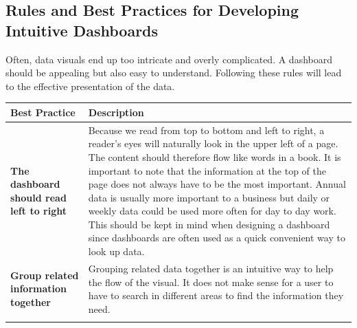 \documentclass[]{book}
\theoremstyle{definition}
\theoremstyle{definition}
\theoremstyle{definition}
\theoremstyle{remark}
\begin{document}
\subsection{Rules and Best Practices for Developing Intuitive
Dashboards}\label{rules-and-best-practices-for-developing-intuitive-dashboards}

Often, data visuals end up too intricate and overly complicated. A
dashboard should be appealing but also easy to understand. Following
these rules will lead to the effective presentation of the data.

\begin{longtable}[]{@{}ll@{}}
\toprule
\begin{minipage}[b]{0.17\columnwidth}\raggedright\strut
Best Practice\strut
\end{minipage} & \begin{minipage}[b]{0.72\columnwidth}\raggedright\strut
Description\strut
\end{minipage}\tabularnewline
\midrule
\endhead
\begin{minipage}[t]{0.17\columnwidth}\raggedright\strut
\textbf{The dashboard should read left to right}\strut
\end{minipage} & \begin{minipage}[t]{0.72\columnwidth}\raggedright\strut
Because we read from top to bottom and left to right, a reader's eyes
will naturally look in the upper left of a page. The content should
therefore flow like words in a book. It is important to note that the
information at the top of the page does not always have to be the most
important. Annual data is usually more important to a business but daily
or weekly data could be used more often for day to day work. This should
be kept in mind when designing a dashboard since dashboards are often
used as a quick convenient way to look up data.\strut
\end{minipage}\tabularnewline
\begin{minipage}[t]{0.17\columnwidth}\raggedright\strut
\textbf{Group related information together}\strut
\end{minipage} & \begin{minipage}[t]{0.72\columnwidth}\raggedright\strut
Grouping related data together is an intuitive way to help the flow of
the visual. It does not make sense for a user to have to search in
different areas to find the information they need.\strut
\end{minipage}\tabularnewline
\begin{minipage}[t]{0.17\columnwidth}\raggedright\strut

\end{minipage}
\end{longtable}
\end{document}
